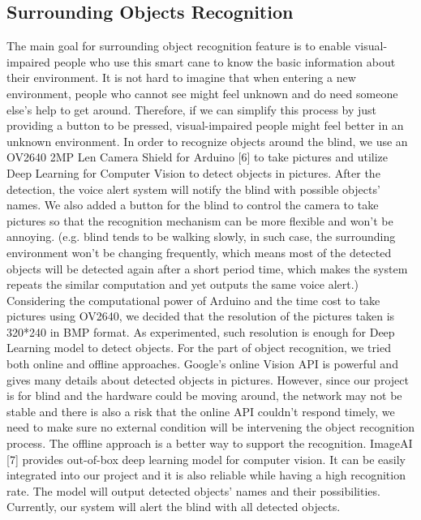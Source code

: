 \subsection{Surrounding Objects Recognition}
The main goal for surrounding object recognition feature is to enable visual-impaired people who use this smart cane to know the basic information about their environment.
It is not hard to imagine that when entering a new environment, people who cannot see might feel unknown and do need someone else's help to get around.
Therefore, if we can simplify this process by just providing a button to be pressed, visual-impaired people might feel better in an unknown environment.
\newline \newline
In order to recognize objects around the blind, we use an OV2640 2MP Len Camera Shield for Arduino [6] to take pictures and utilize Deep Learning for Computer Vision to detect objects in pictures. After the detection, the voice alert system will notify the blind with possible objects’ names. We also added a button for the blind to control the camera to take pictures so that the recognition mechanism can be more flexible and won’t be annoying. (e.g. blind tends to be walking slowly, in such case, the surrounding environment won’t be changing frequently, which means most of the detected objects will be detected again after a short period time, which makes the system repeats the similar computation and yet outputs the same voice alert.)  
\newline \newline
Considering the computational power of Arduino and the time cost to take pictures using OV2640, we decided that the resolution of the pictures taken is 320*240 in BMP format. As experimented, such resolution is enough for Deep Learning model to detect objects. 
\newline \newline
For the part of object recognition, we tried both online and offline approaches. Google’s online Vision API is powerful and gives many details about detected objects in pictures. However, since our project is for blind and the hardware could be moving around, the network may not be stable and there is also a risk that the online API couldn’t respond timely, we need to make sure no external condition will be intervening the object recognition process. The offline approach is a better way to support the recognition. ImageAI [7] provides out-of-box deep learning model for computer vision. It can be easily integrated into our project and it is also reliable while having a high recognition rate. The model will output detected objects’ names and their possibilities. Currently, our system will alert the blind with all detected objects.

